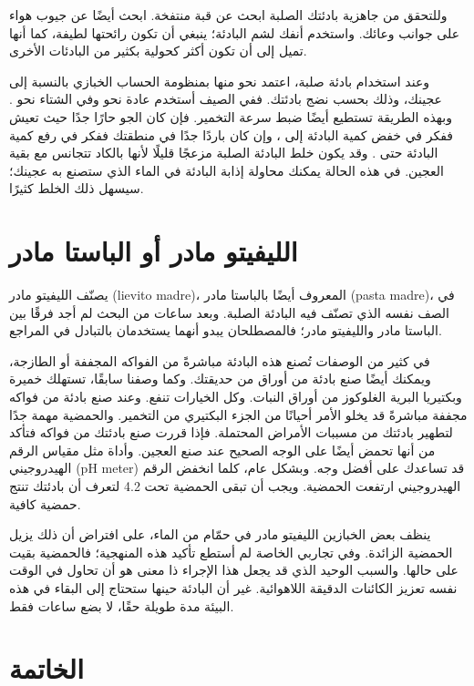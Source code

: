 وللتحقق من جاهزية بادئتك الصلبة ابحث عن قبة منتفخة. ابحث أيضًا عن جيوب هواء على جوانب وعائك. واستخدم أنفك لشم البادئة؛ ينبغي أن تكون رائحتها لطيفة، كما أنها تميل إلى أن تكون أكثر كحولية بكثير من البادئات الأخرى.

وعند استخدام بادئة صلبة، اعتمد نحو  منها بمنظومة الحساب الخبازي بالنسبة إلى عجينك، وذلك بحسب نضج بادئتك. ففي الصيف أستخدم عادة نحو  وفي الشتاء نحو . وبهذه الطريقة تستطيع أيضًا ضبط سرعة التخمير. فإن كان الجو حارًا جدًا حيث تعيش ففكر في خفض كمية البادئة إلى ، وإن كان باردًا جدًا في منطقتك ففكر في رفع كمية البادئة حتى . وقد يكون خلط البادئة الصلبة مزعجًا قليلًا لأنها بالكاد تتجانس مع بقية العجين. في هذه الحالة يمكنك محاولة إذابة البادئة في الماء الذي ستصنع به عجينك؛ سيسهل ذلك الخلط كثيرًا.

\section{الليفيتو مادر أو الباستا مادر}

يصنّف الليفيتو مادر \textenglish{(lievito madre)}، المعروف أيضًا بالباستا مادر \textenglish{(pasta madre)}، في الصف نفسه الذي تصنّف فيه البادئة الصلبة. وبعد ساعات من البحث لم أجد فرقًا بين الباستا مادر والليفيتو مادر؛ فالمصطلحان يبدو أنهما يستخدمان بالتبادل في المراجع.

في كثير من الوصفات تُصنع هذه البادئة مباشرةً من الفواكه المجففة أو الطازجة، ويمكنك أيضًا صنع بادئة من أوراق من حديقتك. وكما وصفنا سابقًا، تستهلك خميرة وبكتيريا البرية الغلوكوز من أوراق النبات. وكل الخيارات تنفع. وعند صنع بادئة من فواكه مجففة مباشرةً قد يخلو الأمر أحيانًا من الجزء البكتيري من التخمير. والحمضية مهمة جدًا لتطهير بادئتك من مسببات الأمراض المحتملة. فإذا قررت صنع بادئتك من فواكه فتأكد من أنها تحمض أيضًا على الوجه الصحيح عند صنع العجين. وأداة مثل مقياس الرقم الهيدروجيني \textenglish{(pH meter)} قد تساعدك على أفضل وجه. وبشكل عام، كلما انخفض الرقم الهيدروجيني ارتفعت الحمضية. ويجب أن تبقى الحمضية تحت \num{4.2} لتعرف أن بادئتك تنتج حمضية كافية.

ينظف بعض الخبازين الليفيتو مادر في حمّام من الماء، على افتراض أن ذلك يزيل الحمضية الزائدة. وفي تجاربي الخاصة لم أستطع تأكيد هذه المنهجية؛ فالحمضية بقيت على حالها. والسبب الوحيد الذي قد يجعل هذا الإجراء ذا معنى هو أن تحاول في الوقت نفسه تعزيز الكائنات الدقيقة اللاهوائية. غير أن البادئة حينها ستحتاج إلى البقاء في هذه البيئة مدة طويلة حقًا، لا بضع ساعات فقط.

\section{الخاتمة}\label{sec:starter-type-conclusion}


